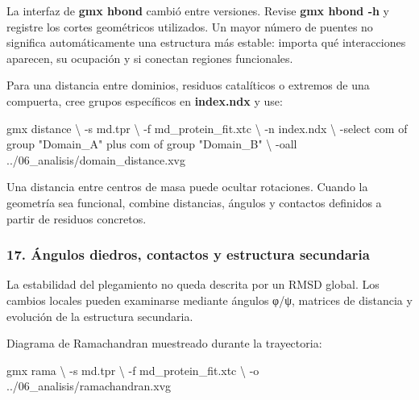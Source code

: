 \documentclass[
  spanish,
  11pt,
  a4paper]{article}
\newenvironment{Shaded}{\begin{snugshade}}{\end{snugshade}}
\newcommand{\AttributeTok}[1]{\textcolor[rgb]{0.13,0.29,0.53}{#1}}
\newcommand{\DataTypeTok}[1]{\textcolor[rgb]{0.13,0.29,0.53}{#1}}
\newcommand{\ExtensionTok}[1]{#1}
\newcommand{\NormalTok}[1]{#1}
\newcommand{\StringTok}[1]{\textcolor[rgb]{0.31,0.60,0.02}{#1}}
\begin{document}
La interfaz de \textbf{gmx hbond} cambió entre versiones. Revise
\textbf{gmx hbond -h} y registre los cortes geométricos utilizados. Un
mayor número de puentes no significa automáticamente una estructura más
estable: importa qué interacciones aparecen, su ocupación y si conectan
regiones funcionales.

Para una distancia entre dominios, residuos catalíticos o extremos de
una compuerta, cree grupos específicos en \textbf{index.ndx} y use:

\begin{Shaded}
\begin{Highlighting}[]
\ExtensionTok{gmx}\NormalTok{ distance }\DataTypeTok{\textbackslash{}}
    \AttributeTok{{-}s}\NormalTok{ md.tpr }\DataTypeTok{\textbackslash{}}
    \AttributeTok{{-}f}\NormalTok{ md\_protein\_fit.xtc }\DataTypeTok{\textbackslash{}}
    \AttributeTok{{-}n}\NormalTok{ index.ndx }\DataTypeTok{\textbackslash{}}
    \AttributeTok{{-}select} \StringTok{\textquotesingle{}com of group "Domain\_A" plus com of group "Domain\_B"\textquotesingle{}} \DataTypeTok{\textbackslash{}}
    \AttributeTok{{-}oall}\NormalTok{ ../06\_analisis/domain\_distance.xvg}
\end{Highlighting}
\end{Shaded}

Una distancia entre centros de masa puede ocultar rotaciones. Cuando la
geometría sea funcional, combine distancias, ángulos y contactos
definidos a partir de residuos concretos.

\subsubsection{17. Ángulos diedros, contactos y estructura
secundaria}\label{uxe1ngulos-diedros-contactos-y-estructura-secundaria}

La estabilidad del plegamiento no queda descrita por un RMSD global. Los
cambios locales pueden examinarse mediante ángulos φ/ψ, matrices de
distancia y evolución de la estructura secundaria.

Diagrama de Ramachandran muestreado durante la trayectoria:

\begin{Shaded}
\begin{Highlighting}[]
\ExtensionTok{gmx}\NormalTok{ rama }\DataTypeTok{\textbackslash{}}
    \AttributeTok{{-}s}\NormalTok{ md.tpr }\DataTypeTok{\textbackslash{}}
    \AttributeTok{{-}f}\NormalTok{ md\_protein\_fit.xtc }\DataTypeTok{\textbackslash{}}
    \AttributeTok{{-}o}\NormalTok{ ../06\_analisis/ramachandran.xvg}
\end{Highlighting}
\end{Shaded}
\end{document}

